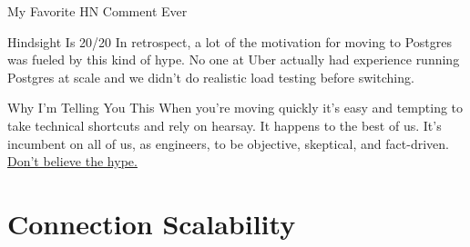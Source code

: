 \documentclass[14pt]{beamer}
\begin{document}
\begin{frame}{My Favorite HN Comment Ever}
\end{frame}

\begin{frame}{Hindsight Is 20/20}
  In retrospect, a lot of the motivation for moving to Postgres was fueled by
  this kind of hype.
  \newline
  \newline
  No one at Uber actually had experience running Postgres at
  scale and we didn't do realistic load testing before switching.
\end{frame}

\begin{frame}{Why I'm Telling You This}
  When you're moving quickly it's easy and tempting to take technical shortcuts
  and rely on hearsay. It happens to the best of us.
  \newline
  \newline
  It's incumbent on all of us, as engineers, to be objective, skeptical, and
  fact-driven.
  \newline
  \newline
  \href{https://www.youtube.com/watch?v=9vQaVIoEjOM}{Don't believe the hype.}
\end{frame}

\section{Connection Scalability}
\end{document}
